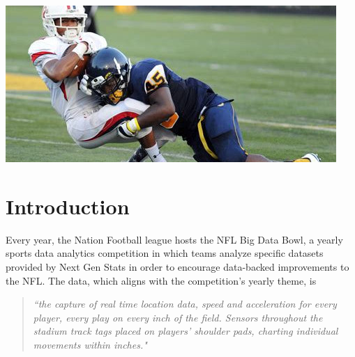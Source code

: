 \documentclass[bibtex, sigconf, hyperref={colorlinks=true,linkcolor=blue,urlcolor=blue}]{acmart}
\begin{document}
\begin{teaserfigure}
  \includegraphics[width=\textwidth]{./th-4169371817}
  \label{fig:teaser}
\end{teaserfigure}


\maketitle

\section{Introduction}

Every year, the Nation Football league hosts the NFL Big Data Bowl, a yearly
sports data analytics competition in which teams analyze specific datasets
provided by Next Gen Stats in order to encourage data-backed improvements to the
NFL. The data, which aligns with the competition's yearly theme, is

\begin{quote}
\textit{``the capture of real time location data, speed and acceleration for
every player, every play on every inch of the field. Sensors throughout the
stadium track tags placed on players' shoulder pads, charting individual
movements within inches."}
\cite{nextgenstats}
\end{quote}
\end{document}
